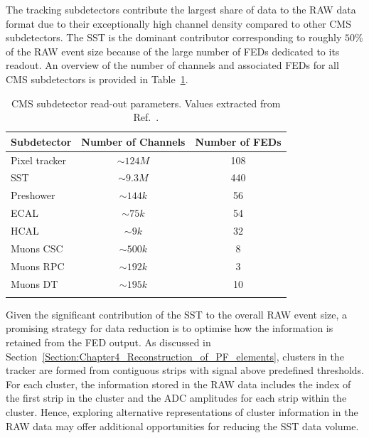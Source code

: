 The tracking subdetectors contribute the largest share of data to the RAW data format due to their exceptionally high channel density compared to other \ac{CMS} subdetectors. The \ac{SST} is the dominant contributor corresponding to roughly $50\%$ of the RAW event size because of the large number of \acp{FED} dedicated to its readout. An overview of the number of channels and associated \acp{FED} for all \ac{CMS} subdetectors is provided in Table~\ref{Table:Chapter4_RAW_Channels_FED}.

\begin{table}[htbp]
\centering
\renewcommand{\arraystretch}{1.5} %
\begin{tabular}{|l|c|c|}
\hline
Subdetector & Number of Channels & Number of \acp{FED} \\
\hline \hline
Pixel tracker & $\sim124\unit{M}$ & 108 \\
\arrayrulecolor{lightgray} \hline
\ac{SST} & $\sim9.3\unit{M}$ & 440 \\
\arrayrulecolor{lightgray} \hline
Preshower & $\sim144\unit{k}$ & 56 \\
\arrayrulecolor{lightgray} \hline
\ac{ECAL} & $\sim75\unit{k}$ & 54 \\
\arrayrulecolor{lightgray} \hline
\ac{HCAL} & $\sim9\unit{k}$ & 32 \\
\arrayrulecolor{lightgray} \hline
Muons \ac{CSC} & $\sim500\unit{k}$ & 8 \\
\arrayrulecolor{lightgray} \hline
Muons \ac{RPC} & $\sim192\unit{k}$ & 3 \\
\arrayrulecolor{lightgray} \hline
Muons \ac{DT} & $\sim195\unit{k}$ & 10 \\
\arrayrulecolor{lightgray} \hline
\arrayrulecolor{black} \hline
\end{tabular}
\caption[CMS subdetector read-out parameters]{\ac{CMS} subdetector read-out parameters. Values extracted from Ref.~\cite{LHC_CMS,CMS_Tracker_Phase1_Upgrade_2}.}
\label{Table:Chapter4_RAW_Channels_FED}
\end{table}

Given the significant contribution of the \ac{SST} to the overall RAW event size, a promising strategy for data reduction is to optimise how the information is retained from the \ac{FED} output. As discussed in Section~\ref{Section:Chapter4_Reconstruction_of_PF_elements}, clusters in the tracker are formed from contiguous strips with signal above predefined thresholds. For each cluster, the information stored in the RAW data includes the index of the first strip in the cluster and the ADC amplitudes for each strip within the cluster. Hence, exploring alternative representations of cluster information in the RAW data may offer additional opportunities for reducing the \ac{SST} data volume.

